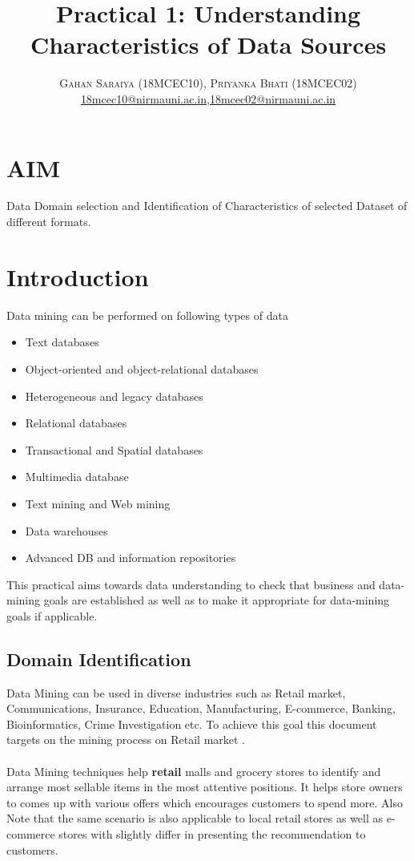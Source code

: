 \documentclass[paper=letter, fontsize=12pt]{article}
\title{\vspace{-15mm}\fontsize{24pt}{10pt}\selectfont\textbf{Practical 1: Understanding Characteristics of Data Sources}} %
\author{
\large
{\textsc{Gahan Saraiya (18MCEC10), Priyanka Bhati (18MCEC02) }}\\[2mm]
\normalsize \href{mailto:18mcec10@nirmauni.ac.in}{18mcec10@nirmauni.ac.in},\href{mailto:18mcec02@nirmauni.ac.in}{18mcec02@nirmauni.ac.in}\\[2mm] %
}
\date{}
\begin{document}
\maketitle %
\thispagestyle{fancy} %

\section{AIM}
Data Domain selection and Identification of Characteristics of selected Dataset of different formats.

\section{Introduction}
Data mining can be performed on following types of data 
\begin{itemize}
	\item Text databases
	\item Object-oriented and object-relational databases
	\item Heterogeneous and legacy databases
	\item Relational databases
	\item Transactional and Spatial databases
	\item Multimedia database
	\item Text mining and Web mining
	\item Data warehouses
	\item Advanced DB and information repositories
	
\end{itemize}
This practical aims towards data understanding to check that business and data-mining goals are established as well as to make it appropriate for data-mining goals if applicable.

\subsection{Domain Identification}
Data Mining can be used in diverse industries such as Retail market, Communications, Insurance, Education, Manufacturing, E-commerce, Banking, Bioinformatics, Crime Investigation etc.
To achieve this goal this document  targets on the mining process on Retail market .
\paragraph{} Data Mining techniques help \textbf{retail} malls and grocery stores to identify and arrange most sellable items in the most attentive positions. It helps store owners to comes up with various offers which encourages customers to spend more. 
Also Note that the same scenario is also applicable to local retail stores as well as e-commerce stores with slightly differ in presenting the recommendation to customers.
\end{document}
